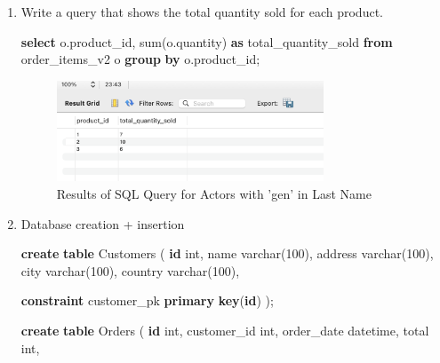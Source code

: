 \documentclass[12pt, french]{article}
\newenvironment{Shaded}{}{}
\newcommand{\KeywordTok}[1]{\textcolor[rgb]{0.00,0.44,0.13}{\textbf{{#1}}}}
\newcommand{\DataTypeTok}[1]{\textcolor[rgb]{0.56,0.13,0.00}{{#1}}}
\newcommand{\DecValTok}[1]{\textcolor[rgb]{0.25,0.63,0.44}{{#1}}}
\newcommand{\FunctionTok}[1]{\textcolor[rgb]{0.02,0.16,0.49}{{#1}}}
\newcommand{\NormalTok}[1]{{#1}}
\begin{document}
\begin{enumerate}
  
\item
  Write a query that shows the total quantity sold for each product.

\begin{Shaded}
\begin{Highlighting}[]
\KeywordTok{select}\NormalTok{ o.product\_id, }\FunctionTok{sum}\NormalTok{(o.quantity) }\KeywordTok{as}\NormalTok{ total\_quantity\_sold}
\KeywordTok{from}\NormalTok{ order\_items\_v2 o}
\KeywordTok{group} \KeywordTok{by}\NormalTok{ o.product\_id;}
\end{Highlighting}
\end{Shaded}

\begin{figure}[H] %
    \centering
    \includegraphics[width=0.75\textwidth]{res/Q10.png}
    \caption{Results of SQL Query for Actors with 'gen' in Last Name}
    \label{fig:actors_with_gen}
\end{figure}


\item
  Database creation + insertion

\begin{Shaded}
\begin{Highlighting}[]
\KeywordTok{create} \KeywordTok{table}\NormalTok{ Customers }
\NormalTok{(}
    \KeywordTok{id} \DataTypeTok{int}\NormalTok{, }
\NormalTok{    name }\DataTypeTok{varchar}\NormalTok{(}\DecValTok{100}\NormalTok{),}
\NormalTok{    address }\DataTypeTok{varchar}\NormalTok{(}\DecValTok{100}\NormalTok{),}
\NormalTok{    city }\DataTypeTok{varchar}\NormalTok{(}\DecValTok{100}\NormalTok{),}
\NormalTok{    country }\DataTypeTok{varchar}\NormalTok{(}\DecValTok{100}\NormalTok{),}

    \KeywordTok{constraint}\NormalTok{ customer\_pk }\KeywordTok{primary} \KeywordTok{key}\NormalTok{(}\KeywordTok{id}\NormalTok{)}
\NormalTok{);}

\KeywordTok{create} \KeywordTok{table}\NormalTok{ Orders}
\NormalTok{(}
    \KeywordTok{id} \DataTypeTok{int}\NormalTok{,}
\NormalTok{    customer\_id }\DataTypeTok{int}\NormalTok{,}
\NormalTok{    order\_date datetime,}
\NormalTok{    total }\DataTypeTok{int}\NormalTok{,}


\end{Highlighting}
\end{Shaded}
\end{enumerate}
\end{document}
